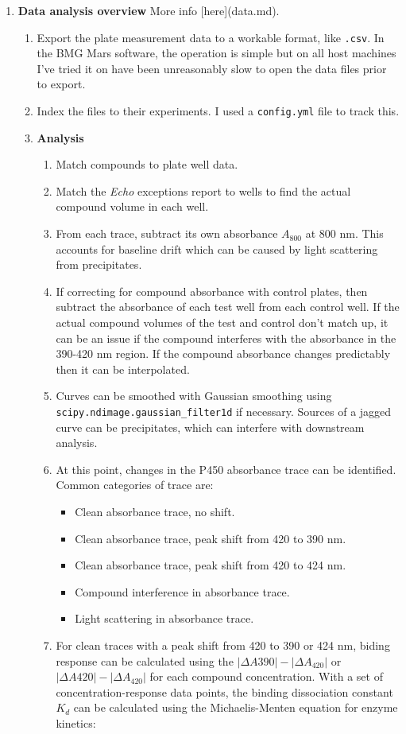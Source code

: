 \documentclass{article}
\begin{document}
\begin{enumerate}
\item \textbf{Data analysis overview}
   More info [here](data.md).
   \begin{enumerate}
	   \item Export the plate measurement data to a workable format, like \texttt{.csv}. 
	   In the BMG Mars software, the operation is simple but on all host machines I've tried it on have been unreasonably slow to open the data files prior to export.
   \item Index the files to their experiments. 
	   I used a \texttt{config.yml} file to track this.
   \item \textbf{Analysis}
		\begin{enumerate}
		\item Match compounds to plate well data.
		\item Match the \textit{Echo} exceptions report to wells to find the actual compound volume in each well.
		\item From each trace, subtract its own absorbance $A_{800}$ at 800 nm.
		   This accounts for baseline drift which can be caused by light scattering from precipitates.
		\item If correcting for compound absorbance with control plates, then subtract the absorbance of each test well from each control well.
		        If the actual compound volumes of the test and control don't match up, it can be an issue if the compound interferes with the absorbance in the 390-420 nm region.
		        If the compound absorbance changes predictably then it can be interpolated.
		\item Curves can be smoothed with Gaussian smoothing using \texttt{scipy.ndimage.gaussian\_filter1d} if necessary.
		        Sources of a jagged curve can be precipitates, which can interfere with downstream analysis.
		\item At this point, changes in the P450 absorbance trace can be identified.
		   Common categories of trace are:
			\begin{itemize}
			   \item Clean absorbance trace, no shift.
			   \item Clean absorbance trace, peak shift from 420 to 390 nm.
			   \item Clean absorbance trace, peak shift from 420 to 424 nm.
			   \item Compound interference in absorbance trace.
			   \item Light scattering in absorbance trace.
			\end{itemize}
		   \item For clean traces with a peak shift from 420 to 390 or 424 nm, biding response can be calculated using the $|\Delta A{390}| - |\Delta A_{420}|$ or $|\Delta A{420}| - |\Delta A_{420}|$  for each compound concentration.
		   With a set of concentration-response data points, the binding dissociation constant $K_d$ can be calculated using the Michaelis-Menten equation for enzyme kinetics:


\end{enumerate}
\end{enumerate}
\end{enumerate}
\end{document}
